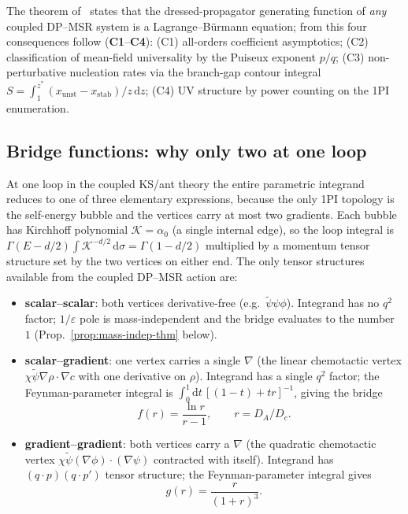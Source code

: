 \documentclass[10pt,a4paper,twocolumn]{article}
\newcommand{\dd}{\mathrm{d}}
\newcommand{\psit}{\tilde\psi}
\newcommand{\KK}{\mathcal{K}}
\theoremstyle{definition}
\begin{document}
The theorem of~\citep{Amarteifio2026cfactheorem} states that the
dressed-propagator generating function of \emph{any} coupled
DP--MSR system is a Lagrange--B\"urmann equation; from this four
consequences follow (\textbf{C1}--\textbf{C4}): (C1) all-orders
coefficient asymptotics; (C2) classification of mean-field
universality by the Puiseux exponent $p/q$; (C3) non-perturbative
nucleation rates via the branch-gap contour integral
$S = \int_1^{z^*}(x_{\text{unst}}-x_{\text{stab}})/z\,\dd z$;
(C4) UV structure by power counting on the 1PI enumeration.

\subsection{Bridge functions: why only two at one loop}
At one loop in the coupled KS/ant theory the entire parametric
integrand reduces to one of three elementary expressions, because
the only 1PI topology is the self-energy bubble and the
vertices carry at most two gradients.  Each bubble has
Kirchhoff polynomial $\KK = \alpha_0$ (a single internal edge),
so the loop integral is $\Gamma(E - d/2)\int\KK^{-d/2}\,\dd\sigma
= \Gamma(1-d/2)$ multiplied by a momentum tensor structure set
by the two vertices on either end.  The only tensor structures
available from the coupled DP--MSR action are:
\begin{itemize}
  \item \textbf{scalar--scalar}: both vertices derivative-free
    (e.g.\ $\psit\psi\phi$).  Integrand has no $q^2$ factor;
    $1/\varepsilon$ pole is mass-independent and the bridge
    evaluates to the number~$1$ (Prop.~\ref{prop:mass-indep-thm}
    below).
  \item \textbf{scalar--gradient}: one vertex carries a single
    $\nabla$ (the linear chemotactic vertex
    $\chi\psit\nabla\rho\cdot\nabla c$ with one derivative on
    $\rho$).  Integrand has a single $q^2$ factor; the
    Feynman-parameter integral is $\int_0^1 \dd t\,
    [(1{-}t)+tr]^{-1}$, giving the bridge
    \begin{equation}\label{eq:bridge-f}
      f(r) = \frac{\ln r}{r-1}, \qquad r = D_A/D_c.
    \end{equation}
  \item \textbf{gradient--gradient}: both vertices carry a
    $\nabla$ (the quadratic chemotactic vertex
    $\chi\psit(\nabla\phi)\cdot(\nabla\psi)$ contracted with
    itself).  Integrand has $(q\cdot p)(q\cdot p')$ tensor
    structure; the Feynman-parameter integral gives
    \begin{equation}\label{eq:bridge-g}
      g(r) = \frac{r}{(1+r)^3}.
    \end{equation}
\end{itemize}
\end{document}
